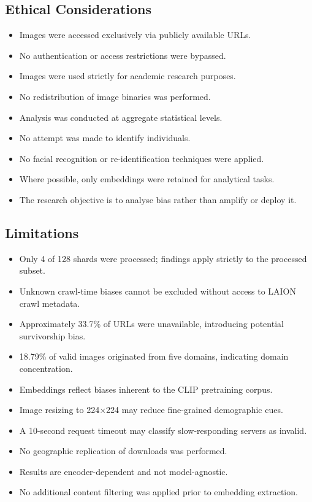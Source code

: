 \subsection{Ethical Considerations}

\begin{itemize}
	\item Images were accessed exclusively via publicly available URLs.
	\item No authentication or access restrictions were bypassed.
	\item Images were used strictly for academic research purposes.
	\item No redistribution of image binaries was performed.
	\item Analysis was conducted at aggregate statistical levels.
	\item No attempt was made to identify individuals.
	\item No facial recognition or re-identification techniques were applied.
	\item Where possible, only embeddings were retained for analytical tasks.
	\item The research objective is to analyse bias rather than amplify or
	deploy it.
\end{itemize}

\subsection{Limitations}

\begin{itemize}
	\item Only 4 of 128 shards were processed; findings apply strictly to
	the processed subset.
	\item Unknown crawl-time biases cannot be excluded without access to
	LAION crawl metadata.
	\item Approximately 33.7\% of URLs were unavailable, introducing
	potential survivorship bias.
	\item 18.79\% of valid images originated from five domains, indicating
	domain concentration.
	\item Embeddings reflect biases inherent to the CLIP pretraining corpus.
	\item Image resizing to 224$\times$224 may reduce fine-grained
	demographic cues.
	\item A 10-second request timeout may classify slow-responding servers
	as invalid.
	\item No geographic replication of downloads was performed.
	\item Results are encoder-dependent and not model-agnostic.
	\item No additional content filtering was applied prior to embedding
	extraction.
\end{itemize}


